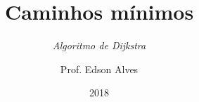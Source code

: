 \title{Caminhos mínimos}
\subtitle{\textit{Algoritmo de Dijkstra}}
\date{2018}
\author{Prof. Edson Alves}
